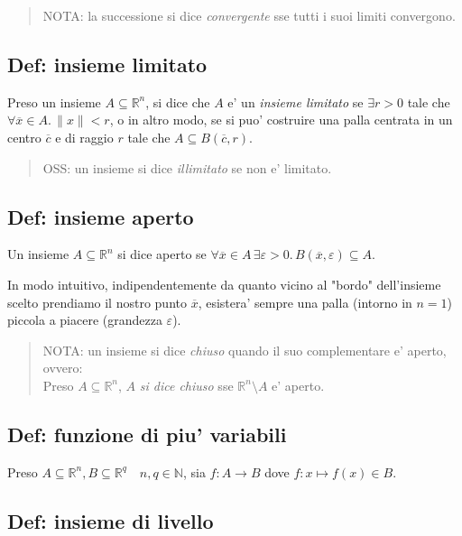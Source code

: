 \documentclass{article}
\begin{document}
\begin{quote}
  NOTA: la successione si dice \emph{convergente} sse tutti i suoi limiti convergono.
\end{quote}

\subsection{Def: insieme limitato}

Preso un insieme $A \subseteq \mathbb{R}^n$, si dice che $A$ e' un \emph{insieme
limitato} se $\exists r > 0$ tale che $\forall \overline{x} \in A. \, \|x\| < r$,
o in altro modo, se si puo' costruire una palla centrata in un centro $\overline{c}$
e di raggio $r$ tale che $A \subseteq B(\overline{c}, r)$.

\begin{quote}
  OSS: un insieme si dice \emph{illimitato} se non e' limitato.
\end{quote}

\subsection{Def: insieme aperto}

Un insieme $A \subseteq \mathbb{R}^n$ si dice aperto se $\forall \overline{x}
\in A \, \exists  \varepsilon > 0. \, B(\overline{x}, \varepsilon) \subseteq A$.

In modo intuitivo, indipendentemente da quanto vicino al "bordo" dell'insieme scelto
prendiamo il nostro punto $\overline{x}$, esistera' sempre una palla (intorno in $n = 1$)
piccola a piacere (grandezza $\varepsilon$).

\begin{quote}
  NOTA: un insieme si dice \emph{chiuso} quando il suo complementare e' aperto, ovvero: \\
  Preso $A \subseteq \mathbb{R}^n$, $A$ \emph{si dice chiuso} sse $\mathbb{R}^n \setminus A$ e' aperto.
\end{quote}

\subsection{Def: funzione di piu' variabili}

Preso $A \subseteq \mathbb{R}^n, B \subseteq \mathbb{R}^q \quad n, q \in \mathbb{N}$,
sia $f: A \to B$ dove $f: x \mapsto f(x) \in B$.

\subsection{Def: insieme di livello}
\end{document}
